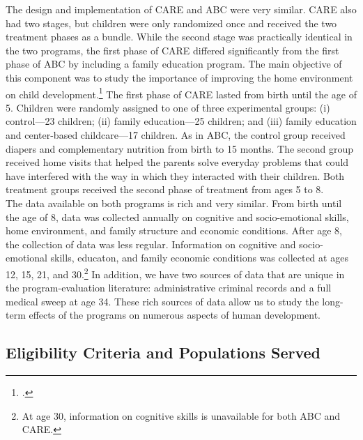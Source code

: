 \noindent The design and implementation of CARE and ABC were very similar. CARE also had two stages, but children were only randomized once and received the two treatment phases as a bundle. While the second stage was practically identical in the two programs, the first phase of CARE differed significantly from the first phase of ABC by including a family education program. The main objective of this component  was to study the importance of improving the home environment on child development.\footnote{\citet{Wasik_Ramey_etal_1990_CD}.} The first phase of CARE lasted from birth until the age of 5. Children were randomly assigned to one of three experimental groups: (i) control---23 children; (ii) family education---25 children; and (iii) family education and center-based childcare---17 children. As in ABC, the control group received diapers and complementary nutrition from birth to 15 months. The second group received home visits that helped the parents solve everyday problems that could have interfered with the way in which they interacted with their children. Both treatment groups received the second phase of treatment from ages 5 to 8.\\

\noindent The data available on both programs is rich and very similar. From birth until the age of 8, data was collected annually on cognitive and socio-emotional skills, home environment, and family structure and economic conditions. After age 8, the collection of data was less regular. Information on cognitive and socio-emotional skills, educaton, and family economic conditions was collected at ages 12, 15, 21, and 30.\footnote{At age 30, information on cognitive skills is unavailable for both ABC and CARE.} In addition, we have two sources of data that are unique in the program-evaluation literature: administrative criminal records and a full medical sweep at age 34. These rich sources of data allow us to study the long-term effects of the programs on numerous aspects of human development.

\subsection{Eligibility Criteria and Populations Served} \label{section:eligibility}

